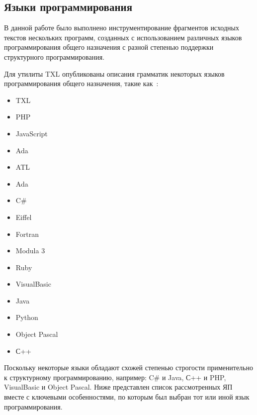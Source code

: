 \subsection{Языки программирования}

В данной работе было выполнено инструментирование фрагментов исходных текстов нескольких программ, созданных с использованием различных языков программирования общего назначения с разной степенью поддержки структурного программирования.

Для утилиты TXL опубликованы описания грамматик некоторых языков программирования общего назначения, такие как~\cite{txl-resources}:
\begin{multicols}{2}
\begin{itemize}[noitemsep]
  \item TXL
  \item PHP
  \item JavaScript
  \item Ada
  \item ATL
  \item Ada
  \item C\#
  \item Eiffel
  \item Fortran
  \item Modula 3
  \item Ruby
  \item VisualBasic

  \item Java
  \item Python
  \item Object Pascal
  \item С++
\end{itemize}
\end{multicols}

Поскольку некоторые языки обладают схожей степенью строгости применительно к структурному программированию, например: C\# и Java, С++ и PHP, VisualBasic и Object Pascal.
Ниже представлен список рассмотренных ЯП вместе с ключевыми особенностями, по которым был выбран тот или иной язык программирования.

